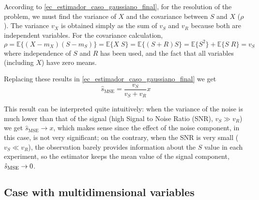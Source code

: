 \begin{example}
According to \eqref{ec_estimador_caso_gaussiano_final}, for the resolution of the problem, we must find the variance of $X$ and the covariance between $S$ and $X$ ($\rho$). The variance $v_X$ is obtained simply as the sum of $v_S$ and $v_R$ because both are independent variables. For the covariance calculation,
\begin{equation}
\rho = \mathbb{E} \{(X-m_X)(S-m_S)\} = \mathbb{E} \{X\;S\} = \mathbb{E} \{(S + R) S\} = \mathbb{E} \{S^2\} + \mathbb{E} \{S\;R\} = v_S
\end{equation}
where independence of $S$ and $R$ has been used, and the fact that all variables (including $X$) have zero means.

Replacing these results in \eqref{ec_estimador_caso_gaussiano_final} we get
\begin{equation}
\hat s_{\text{MSE}} = \frac{v_S}{v_S + v_R} x
\end{equation}

This result can be interpreted quite intuitively: when the variance of the noise is much lower than that of the signal (high Signal to Noise Ratio (SNR), $v_S \gg v_R$) we get $\hat s_{\text{MSE}} \to x$, which makes sense since the effect of the noise component, in this case, is not very significant; on the contrary, when the SNR is very small ($v_S \ll v_R$), the observation barely provides information about the $S$ value in each experiment, so the estimator keeps the mean value of the signal component, $\hat{s}_\text{MSE} \to 0$.
\end{example} %


\subsection{Case with multidimensional variables}

